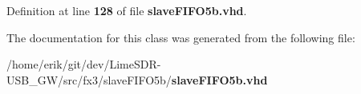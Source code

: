 Definition at line {\bf 128} of file {\bf slave\+F\+I\+F\+O5b.\+vhd}.



The documentation for this class was generated from the following file\+:\begin{DoxyCompactItemize}
\item 
/home/erik/git/dev/\+Lime\+S\+D\+R-\/\+U\+S\+B\+\_\+\+G\+W/src/fx3/slave\+F\+I\+F\+O5b/{\bf slave\+F\+I\+F\+O5b.\+vhd}\end{DoxyCompactItemize}
